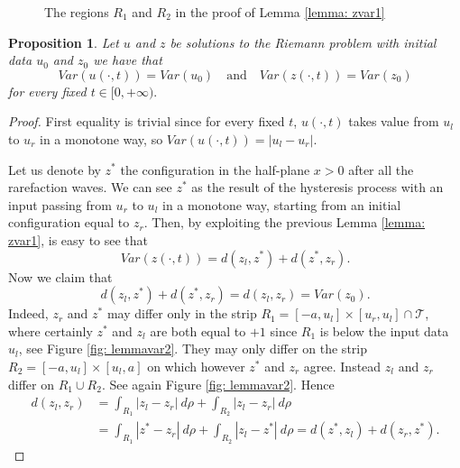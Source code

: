 \documentclass[12pt]{article}
\newcommand{\T}{\mathcal{T}}
\newcommand{\p}{\rho}
\newcommand{\1}{\mathds{1}}
\newtheorem{prop}[teo]{Proposition}
\theoremstyle{definition}
\begin{document}
\begin{figure}
        
        \caption{The regions $R_1$ and $R_2$ in the proof of Lemma \ref{lemma: zvar1}}
        \label{fig: lemmavar}
\end{figure}

\begin{prop}\label{prop: vartot}
    Let $u$ and $z$ be solutions to the Riemann problem with initial data $u_0$ and $z_0$ we have that \begin{equation}
        Var(u(\cdot,t))=Var(u_0) \quad\text{and} \quad Var(z(\cdot,t))=Var(z_0)
    \end{equation}
    for every fixed $t\in [0,+\infty).$
\end{prop}
\begin{proof}
    First equality is trivial since for every fixed $t$, $u(\cdot,t)$ takes value from $u_l$ to $u_r$ in a monotone way, so $ Var(u(\cdot,t))=|u_l-u_r|$. \par Let us denote by $z^*$ the configuration in the half-plane $x>0$ after all the rarefaction waves. We can see $z^*$ as the result of the hysteresis process with an input passing from $u_r$ to $u_l$ in a monotone way, starting from an initial configuration equal to $z_r$. Then, by exploiting the previous Lemma \ref{lemma: zvar1}, is easy to see that \[Var(z(\cdot,t))=d(z_l,z^*)+d(z^*,z_r).\] Now we claim that \[d(z_l,z^*)+d(z^*,z_r)=d(z_l,z_r)=Var(z_0).\] Indeed, $z_r$ and $z^*$ may differ only in the strip $R_1=[-a,u_l]\times[u_r,u_l]\cap \T$, where certainly $z^*$ and $z_l$ are both equal to $+1$ since $R_1$ is below the input data $u_l$, see Figure \ref{fig: lemmavar2}. They may only differ on the strip $R_2=[-a,u_l]\times[u_l,a]$ on which however $z^*$ and $z_r$ agree. Instead $z_l$ and $z_r$ differ on $R_1\cup R_2$. See again Figure \ref{fig: lemmavar2}. Hence \[\begin{split} d(z_l,z_r)&=\int_{R_1} |z_l-z_r| ~d\p + \int_{R_2} |z_l-z_r| ~d\p \\&= \int_{R_1} |z^*-z_r| ~d\p + \int_{R_2} |z_l-z^*| ~d\p=d(z^*,z_l)+d(z_r,z^*).\end{split}\] 
\end{proof}
\end{document}
